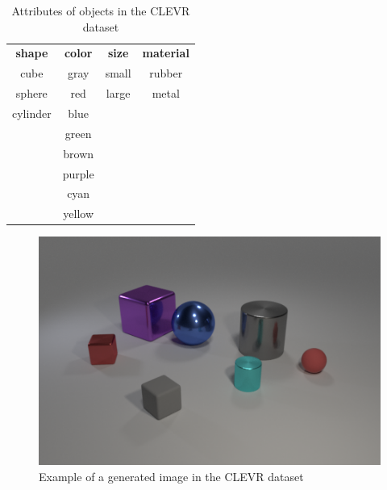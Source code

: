 \begin{table}[ht]
    \centering
    \begin{tabular}{cccc}
        \toprule
        \textbf{ shape } & \textbf{ color } & \textbf{ size } & \textbf{ material } \\
        cube             & gray             & small           & rubber              \\
        sphere           & red              & large           & metal               \\
        cylinder         & blue                                                     \\
                         & green                                                    \\
                         & brown                                                    \\
                         & purple                                                   \\
                         & cyan                                                     \\
                         & yellow                                                   \\
        \bottomrule
    \end{tabular}
    \caption{Attributes of objects in the CLEVR dataset}
    \label{tab:clevr-attributes}
\end{table}

\begin{figure}[ht]
    \centering
    \includegraphics[width=.8\linewidth]{figures/CLEVR_example.png}
    \caption{Example of a generated image in the CLEVR dataset}
    \label{fig:clevr-example}
\end{figure}

